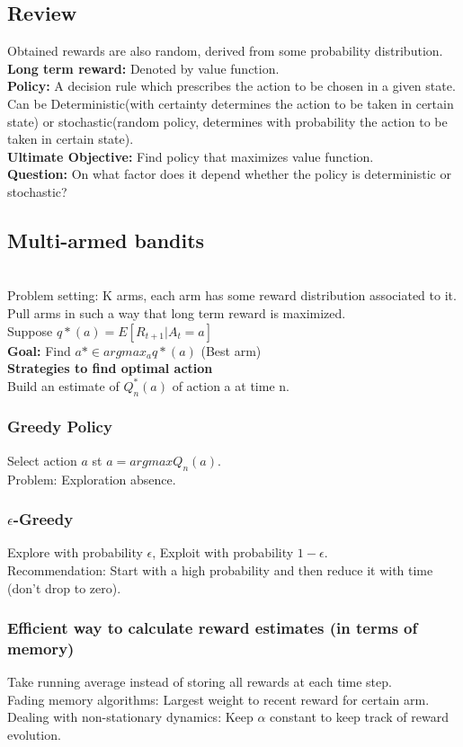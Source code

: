 \documentclass{book}
\begin{document}
\subsection{Review}
Obtained rewards are also random, derived from some probability distribution.\\
\textbf{Long term reward:} Denoted by value function.\\
\textbf{Policy:} A decision rule which prescribes the action to be chosen in a given state.\\
Can be Deterministic(with certainty determines the action to be taken in certain state) or stochastic(random policy, determines with probability the action to be taken in certain state).\\
\textbf{Ultimate Objective:} Find policy that maximizes value function.\\
\textbf{Question:} On what factor does it depend whether the policy is deterministic or stochastic?

\subsection{Multi-armed bandits}
\\
Problem setting: K arms, each arm has some reward distribution associated to it. Pull arms in such a way that long term reward is maximized.\\

\noindent Suppose $q*(a) = E[R_{t+1} | A_{t} = a]$\\
\textbf{Goal:} Find $a* \in argmax_{a} q*(a)$ (Best arm) \\

\textbf{Strategies to find optimal action}\\
Build an estimate of $Q_{n}^{*}(a)$ of action a at time n.\\

\subsubsection{Greedy Policy}
Select action $a$ st $a = argmax Q_{n}(a)$.\\
Problem: Exploration absence.\\

\subsubsection{$\epsilon$-Greedy}
Explore with probability $\epsilon$, Exploit with probability $1-\epsilon$.\\
Recommendation: Start with a high probability and then reduce it with time (don't drop to zero).\\

\subsubsection{Efficient way to calculate reward estimates (in terms of memory)}
Take running average instead of storing all rewards at each time step.\\
Fading memory algorithms: Largest weight to recent reward for certain arm.\\
Dealing with non-stationary dynamics: Keep $\alpha$ constant to keep track of reward evolution.
\end{document}
